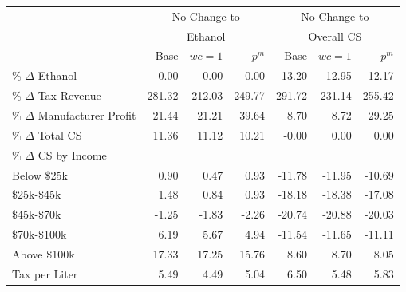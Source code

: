 \begin{tabular}{l rrr rrr} 
  
& \multicolumn{3}{c}{No Change to} & \multicolumn{3}{c}{No Change to}   \\ 
& \multicolumn{3}{c}{Ethanol} & \multicolumn{3}{c}{Overall CS} \\ 
& Base & $wc=1$ & $p^m$ & Base & $wc=1$ & $p^m$ \\ \toprule
\% $\Delta$ Ethanol & 0.00 & -0.00 & -0.00 & -13.20 & -12.95 & -12.17 \\
\% $\Delta$ Tax Revenue & 281.32 & 212.03 & 249.77 & 291.72 & 231.14 & 255.42 \\
\% $\Delta$ Manufacturer Profit & 21.44 & 21.21 & 39.64 & 8.70 & 8.72 & 29.25 \\
\% $\Delta$ Total CS & 11.36 & 11.12 & 10.21 & -0.00 & 0.00 & 0.00 \\
\midrule
\% $\Delta$ CS by Income &&& &&\\ 
Below \$25k & 0.90 & 0.47 & 0.93 & -11.78 & -11.95 & -10.69 \\
\$25k-\$45k & 1.48 & 0.84 & 0.93 & -18.18 & -18.38 & -17.08 \\
\$45k-\$70k & -1.25 & -1.83 & -2.26 & -20.74 & -20.88 & -20.03 \\
\$70k-\$100k & 6.19 & 5.67 & 4.94 & -11.54 & -11.65 & -11.11 \\
Above \$100k & 17.33 & 17.25 & 15.76 & 8.60 & 8.70 & 8.05 \\
\midrule
Tax per Liter & 5.49 & 4.49 & 5.04 & 6.50 & 5.48 & 5.83 \\
\bottomrule 
 \end{tabular}